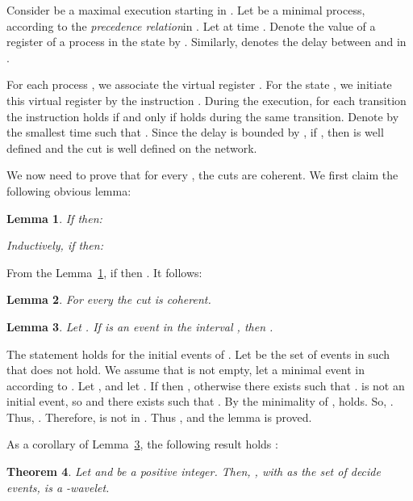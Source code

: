\documentclass[11pt]{article}
\newenvironment{proof}{{\bf Proof. } }{{\hfill }\vspace{.5pc}}
\newtheorem{theorem}{Theorem}[section]
\newtheorem{lemma}[theorem]{Lemma}
\begin{document}
Consider  be a maximal execution starting in .  
Let  be a minimal process, according to the \emph{precedence relation}in . Let  at time .
Denote the value of a register  of a process  in the state  by . Similarly,  denotes the delay between  and  in . 

For each process , we associate the virtual register . For the state ,
we initiate this virtual register by  the instruction 
. During the execution, for each  transition  the instruction  holds 
if and only if  holds during the same transition.
Denote by  the smallest time such that .  Since the delay is
bounded by , if , then  is well defined and the cut   is well defined on the network.
 
We now need to prove that for every , the cuts  are coherent.  We first claim the following obvious lemma:



\begin{lemma}
\label{lem:coherent}
If   then: 

 
Inductively, if 
   then: 

\end{lemma}

From the Lemma~\ref{lem:coherent},  
if  then . It follows:

\begin{lemma}
For every  the cut  is coherent.
\end{lemma}



\begin{lemma}
\label{lem:cover}
Let . If  is an event in the interval  
, then .
\end{lemma}

\begin{proof}
The statement holds for the initial events of . Let  be the set of events  in   such that  does not hold.  We assume that  is not empty, let  a minimal event in  according to . 
Let , and let . 
If  then , otherwise there exists  such that .  is not
an initial event, so  and there exists  such that  .  By the minimality of , 
 holds.  So,  
. Thus, .
Therefore,  is not in . Thus  , 
and the lemma is proved.
\end{proof}

As a corollary of Lemma~\ref{lem:cover}, the following result holds : 

\begin{theorem}
\label{th:unison_behavior}
Let  and  be a positive integer. Then, 
, with  as the set of decide events, 
is a -wavelet.
\end{theorem}
\end{document}

